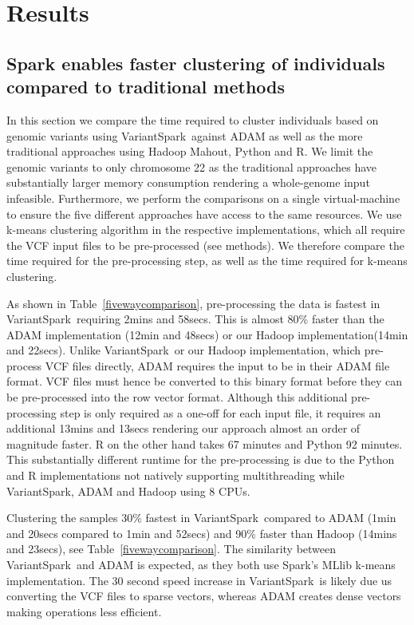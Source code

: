 \documentclass{bmcart}
\newcommand{\variantSpark}{{\sc VariantSpark}}
\begin{document}
\section*{Results}
\subsection*{{\sc Spark} enables faster clustering of individuals compared to traditional methods}

In this section we compare the time required to cluster individuals based on genomic variants using \variantSpark\ against ADAM as well as the more traditional approaches using Hadoop Mahout, Python and R. 
We limit the genomic variants to only chromosome 22 as the traditional approaches have substantially larger memory consumption rendering a whole-genome input infeasible.  
Furthermore, we perform the comparisons on a single virtual-machine to ensure the five different approaches have access to the same resources.
We use k-means clustering algorithm in the respective implementations, which all require the VCF input files to be pre-processed (see methods). 
We therefore compare the time required for the pre-processing step, as well as the time required for k-means clustering.

As shown in Table~\ref{fivewaycomparison}, pre-processing the data is fastest in \variantSpark\, requiring 2mins and 58secs. %
This is almost 80\% faster than the ADAM implementation (12min and 48secs) %
or our Hadoop implementation(14min and 22secs). %
Unlike \variantSpark\ or our Hadoop implementation, which pre-process VCF files directly, ADAM requires the input to be in their ADAM file format. 
VCF files must hence be converted to this binary format before they can be pre-processed into the row vector format. 
Although this additional pre-processing step is only required as a one-off for each input file, it requires an additional 13mins and 13secs %
rendering our approach almost an order of magnitude faster. 
R on the other hand takes 67 minutes and Python 92 minutes.
This substantially different runtime for the pre-processing is due to the Python and R implementations not natively supporting multithreading while \variantSpark, ADAM and Hadoop using 8 CPUs.

Clustering the samples 30\% fastest in \variantSpark\ compared to ADAM (1min and 20secs compared to 1min and 52secs) and  %
90\% faster than Hadoop (14mins and 23secs), see Table~\ref{fivewaycomparison}.
The similarity between \variantSpark\ and ADAM is expected, as they both use {\sc Spark}'s MLlib k-means implementation. 
The 30 second speed increase in \variantSpark\ is likely due us converting the VCF files to sparse vectors, whereas ADAM creates dense vectors making operations less efficient.
\end{document}
